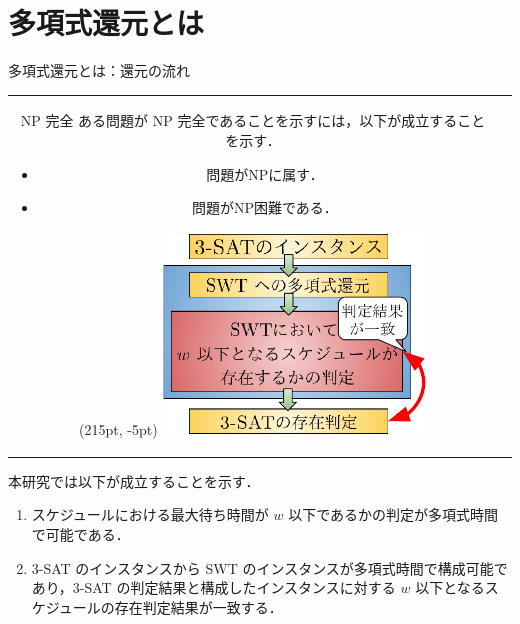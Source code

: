 \documentclass[dvipdfmx]{beamer}
\begin{document}
    \section{多項式還元とは}
    \begin{frame}{多項式還元とは：還元の流れ}
      \begin{tabular}{cc}
        \begin{minipage}[c]{0.5\hsize}
          \begin{block}{NP 完全}
            ある問題が NP 完全であることを示すには，以下が成立することを示す．
            \begin{itemize}
              \item 問題がNPに属す．
              \item 問題がNP困難である．
            \end{itemize}
          \end{block}
        \end{minipage}
        \begin{minipage}[c]{0.5\hsize}
          \begin{textblock*}{0.4\linewidth}(215pt, -5pt)
            \centering
            \includegraphics[width=7cm,bb=0 0 350 260]{figure/reduction.pdf}
          \end{textblock*}
        \end{minipage}
      \end{tabular}
      \begin{block}{}
        本研究では以下が成立することを示す．
        \begin{enumerate}
          \item スケジュールにおける最大待ち時間が $w$ 以下であるかの判定が\alert{多項式時間}で可能である．
          \item \textsc{3-SAT} のインスタンスから SWT のインスタンスが\alert{多項式時間}で構成可能であり，\textsc{3-SAT} の判定結果と構成したインスタンスに対する $w$ 以下となるスケジュールの存在判定結果が\alert{一致}する．
        \end{enumerate}
      \end{block}
    \end{frame}
\end{document}
